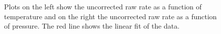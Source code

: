 \documentclass[prX, twocolumn, a4paper]{revtex4}
\begin{document}
\begin{figure}
    \caption{Plots on the left show the uncorrected raw rate as a function of temperature and on the right the uncorrected raw rate as a function of pressure. The red line shows the linear fit of the data.}
    \label{fig:raw_temp_press_all}
\end{figure}

\newpage


\end{document}
